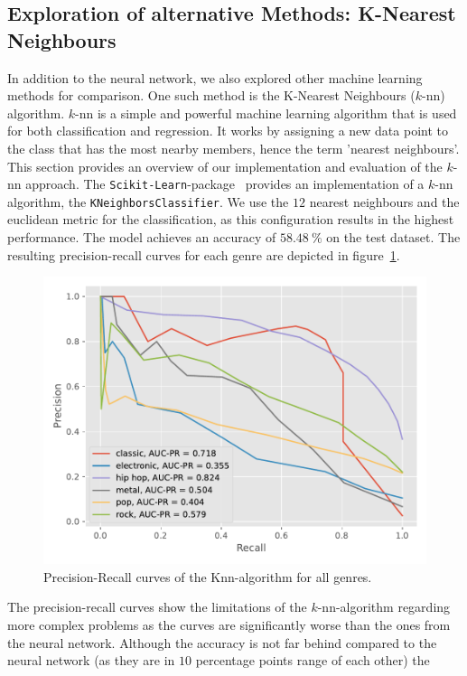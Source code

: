 \documentclass[
  12pt,
  bibliography=totoc,     %
  captions=tableheading,  %
  titlepage=firstiscover, %
]{scrartcl}
\begin{document}
\subsection{Exploration of alternative Methods: K-Nearest Neighbours}
In addition to the neural network, we also explored other machine learning methods for comparison. One such method is the K-Nearest Neighbours ($k$-nn) algorithm. $k$-nn is a
simple and powerful machine learning algorithm that is used for both classification and regression. It works by assigning a new data point to the class that has the most
nearby members, hence the term 'nearest neighbours'. This section provides an overview of our implementation and evaluation of the $k$-nn approach.
The \texttt{Scikit-Learn}-package~\cite{scikit-learn} provides an implementation of a $k$-nn algorithm, the \texttt{KNeighborsClassifier}.
We use the $12$ nearest neighbours and the euclidean metric for the classification, as this configuration results in the highest performance. The model achieves an accuracy
of $\SI{58.48}{\percent}$ on the test dataset.
The resulting precision-recall curves for each genre are depicted in figure~\ref{fig:pr_knn}.
\begin{figure}[H]
  \centering
  \includegraphics[scale=0.6]{figures/knn/PR_KNN.pdf}
  \caption{Precision-Recall curves of the Knn-algorithm for all genres.}
  \label{fig:pr_knn}
\end{figure}
\noindent
The precision-recall curves show the limitations of the $k$-nn-algorithm regarding more complex problems as the curves are significantly worse than the ones
from the neural network. Although the accuracy is not far behind compared to the neural network (as they are in $\num{10}$ percentage points range of each other) the
\end{document}
